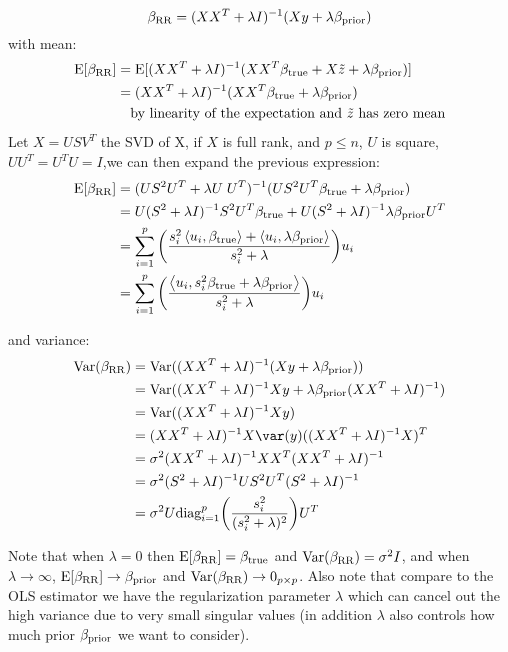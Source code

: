 \documentclass[12pt,twoside]{article}
\begin{document}
\begin{enumerate}
\begin{enumerate}
  $$\beta_{\operatorname{RR}}  =   (X X^T  +  \lambda I)^{-1} (X y + \lambda \beta_{\operatorname{prior}})$$
  with mean:
\begin{align*}
  	\mathrm{E}[\beta_{\operatorname{RR}} ]		&= 		\mathrm{E}[ (X X^T  +  \lambda I)^{-1} (X X^T \beta_{\operatorname{true}} + X \tilde{ z } +  \lambda \beta_{\operatorname{prior}})] \\
						&=		 (X X^T  +  \lambda I)^{-1} (X X^T \beta_{\operatorname{true}}  + \lambda \beta_{\operatorname{prior}}) \\
						&	\text{ ~ by linearity of the expectation and } \tilde{ z } \text{ has zero mean}
\end{align*} 
Let $X=U S V^T$ the SVD of X, if $X$ is full rank, and $p \le n$, $U$ is square, $UU^T= U^TU = I$,we can then expand the previous expression:
\begin{align*}
	\mathrm{E}[\beta_{\operatorname{RR}} ]		&=	(U S^2 U^T + \lambda U \; U^T)^{-1}	(U S^2 U^T \beta_{\operatorname{true}}  + \lambda \beta_{\operatorname{prior}}) \\
						&=	U (S^2 + \lambda I)^{-1} S^2 U^T  \beta_{\operatorname{true}}  + U (S^2 + \lambda I)^{-1}  \lambda \beta_{\operatorname{prior}} U^T \\
						&=	\sum_{i=1}^p \bigg( \frac{s_i^2 \left \langle u_i, \beta_{\operatorname{true}} \right \rangle + \left \langle u_i,  \lambda \beta_{\operatorname{prior}}\right \rangle} {s_i^2 + \lambda} \bigg) u_i \\
						&=	\sum_{i=1}^p \bigg(   \frac{ \left \langle u_i, s_i^2 \beta_{\operatorname{true}} +  \lambda \beta_{\operatorname{prior}} \right \rangle}  {s_i^2 + \lambda} \bigg) u_i
\end{align*} 

and variance:	
\begin{align*}
	\Var(\beta_{\op{RR}})	&=	\Var( (X X^T  +  \lambda I)^{-1} (X y + \lambda \beta_{\op{prior}})) \\
						&=	\Var( (X X^T  +  \lambda I)^{-1}  X y + \lambda  \beta_{\op{prior}} (X X^T  +  \lambda I)^{-1} ) \\
						&=	\Var( (X X^T  +  \lambda I)^{-1}  X y) \\
						&=	(X X^T  +  \lambda I)^{-1}  X \var(y)	((X X^T  +  \lambda I)^{-1}  X)^T \\
						&=	\sigma^2 (X X^T  +  \lambda I)^{-1}  X X^T (X X^T  +  \lambda I)^{-1} \\
						&=	\sigma^2 (S^2 + \lambda I)^{-1} U S^2 U^T (S^2 + \lambda I)^{-1} \\
						&= 	\sigma^2 	U  \text{diag}_{i=1}^p \bigg( \frac{s_i^2} {(s_i^2 + \lambda)^2} \bigg) 	U^T
\end{align*}					
   
   Note that when $\lambda = 0$ then $\mathrm{E}[\beta_{\operatorname{RR}} ] = \beta_{\operatorname{true}}$ and $\mathrm{Var}(\beta_{\operatorname{RR}}) = \sigma^2 I$,
   and when $\lambda \rightarrow \infty$, $\mathrm{E}[\beta_{\operatorname{RR}} ] \rightarrow  \beta_{\operatorname{prior}}$ and $\mathrm{Var}(\beta_{\operatorname{RR}}) \rightarrow 0_{p \times p}$.
   Also note that compare to the OLS estimator we have the regularization parameter $\lambda$ which can cancel out the high variance due to very small singular values
   (in addition $\lambda$ also controls how much prior $\beta_{\operatorname{prior}}$ we want to consider).
   

\end{enumerate}
\end{enumerate}
\end{document}
